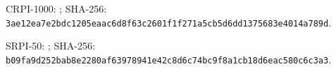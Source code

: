 \begin{landscape}
CRPI-1000: ; SHA-256: \texttt{3ae12ea7\allowbreak{}e2bdc120\allowbreak{}5eaac6d8\allowbreak{}f63c2601\allowbreak{}f1f271a5\allowbreak{}cb5d6dd1\allowbreak{}375683e4\allowbreak{}014a789d}.\par
SRPI-50: ; SHA-256: \texttt{b09fa9d2\allowbreak{}52bab8e2\allowbreak{}280af639\allowbreak{}78941e42\allowbreak{}c8d6c74b\allowbreak{}c9f8a1cb\allowbreak{}18d6eac5\allowbreak{}80c6c3a3}.\par
\endgroup
\end{landscape}

